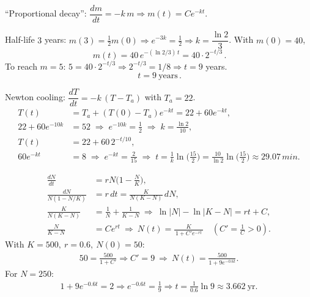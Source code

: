 \documentclass[11pt]{article}
\def\mathrm#1{#1}%
\begin{document}
\begin{solution}
“Proportional decay”: $\dfrac{dm}{dt}=-k\,m\Rightarrow m(t)=C e^{-kt}$.

Half-life $3$ years: $m(3)=\tfrac12 m(0)\Rightarrow e^{-3k}=\tfrac12\Rightarrow k=\dfrac{\ln 2}{3}$.
With $m(0)=40$,
\[
\boxed{\,m(t)=40\,e^{-(\ln 2/3)\,t}=40\cdot 2^{-t/3}\,}.
\]
To reach $m=5$:
$5=40\cdot 2^{-t/3}\Rightarrow 2^{-t/3}=1/8\Rightarrow t=9$ years.
\[
\boxed{\,t=9\ \text{years}\,}.
\]
\end{solution}

\begin{solution}
Newton cooling: $\dfrac{dT}{dt}=-k\,(T-T_a)$ with $T_a=22$.
\begin{align*}
T(t) &= T_a+(T(0)-T_a)e^{-kt}=22+60e^{-kt},\\
22+60e^{-10k} &= 52 \;\Rightarrow\; e^{-10k}=\tfrac12 \;\Rightarrow\; k=\frac{\ln 2}{10},\\
T(t) &= 22+60\,2^{-t/10},\\
60e^{-kt} &= 8 \;\Rightarrow\; e^{-kt}=\tfrac{2}{15}
\;\Rightarrow\; t=\frac{1}{k}\ln\!\Big(\tfrac{15}{2}\Big)
=\frac{10}{\ln 2}\ln\!\Big(\tfrac{15}{2}\Big)\approx 29.07\,\mathrm{min}.
\end{align*}
\end{solution}

\begin{solution}
\begin{align*}
\frac{dN}{dt} &= rN\!\Big(1-\frac{N}{K}\Big),\\
\frac{dN}{N(1-N/K)} &= r\,dt
= \frac{K}{N(K-N)}\,dN,\\[2pt]
\frac{K}{N(K-N)} &= \frac{1}{N}+\frac{1}{K-N}
\ \Rightarrow\ 
\ln|N|-\ln|K-N| = rt + C,\\
\frac{N}{K-N} &= C e^{rt}
\ \Rightarrow\ 
N(t)=\frac{K}{\,1+C' e^{-rt}\,}\quad (C'=\tfrac{1}{C}>0).
\end{align*}
With $K=500,\ r=0.6,\ N(0)=50$:
\begin{align*}
50=\frac{500}{1+C'} \Rightarrow C'=9
\ \Rightarrow\ 
N(t)=\frac{500}{1+9e^{-0.6t}}.
\end{align*}
For $N=250$:
\begin{align*}
1+9e^{-0.6t}=2 \Rightarrow e^{-0.6t}=\frac{1}{9}
\Rightarrow t=\frac{1}{0.6}\ln 9 \approx 3.662\ \text{yr}.
\end{align*}
\end{solution}
\end{document}
